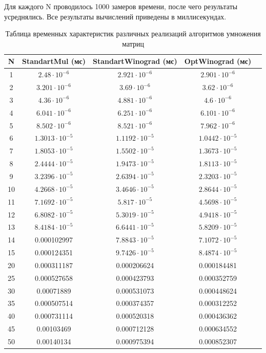 Для каждого N проводилось 1000 замеров времени, после чего результаты усреднялись. Все результаты вычислений приведены в миллисекундах.

\newpage
\begin{table}[!ht]
	\centering
	\caption{Таблица временных характеристик различных реализаций алгоритмов умножения матриц}
	\begin{tabular}{|c|c|c|c|c|}
		\hline
		N   & StandartMul (мс)  & StandartWinograd (мс) & OptWinograd (мс) \\ \hline
		1   & $2.48 \cdot 10^{-6}$   & $2.921 \cdot 10^{-6}$  & $2.901 \cdot 10^{-6}$   \\ \hline
		2   & $3.201 \cdot 10^{-6}$  & $3.69 \cdot 10^{-6}$   & $3.62 \cdot 10^{-6}$    \\ \hline
		3   & $4.36 \cdot 10^{-6}$   & $4.881 \cdot 10^{-6}$  & $4.6 \cdot 10^{-6}$     \\ \hline
		4   & $6.041 \cdot 10^{-6}$  & $6.251 \cdot 10^{-6}$  & $6.101 \cdot 10^{-6}$   \\ \hline
		5   & $8.502 \cdot 10^{-6}$  & $8.521 \cdot 10^{-6}$  & $7.962 \cdot 10^{-6}$   \\ \hline
		6   & $1.3013 \cdot 10^{-5}$ & $1.1192 \cdot 10^{-5}$ & $1.0442 \cdot 10^{-5}$  \\ \hline
		7   & $1.8053 \cdot 10^{-5}$ & $1.5502 \cdot 10^{-5}$ & $1.3673 \cdot 10^{-5}$  \\ \hline
		8   & $2.4444 \cdot 10^{-5}$ & $1.9473 \cdot 10^{-5}$ & $1.8113 \cdot 10^{-5}$  \\ \hline
		9   & $3.2396 \cdot 10^{-5}$ & $2.6394 \cdot 10^{-5}$ & $2.3203 \cdot 10^{-5}$  \\ \hline
		10  & $4.2668 \cdot 10^{-5}$ & $3.4646 \cdot 10^{-5}$ & $2.8644 \cdot 10^{-5}$  \\ \hline
		11  & $7.1692 \cdot 10^{-5}$ & $5.817 \cdot 10^{-5}$  & $4.5698 \cdot 10^{-5}$  \\ \hline
		12  & $6.8082 \cdot 10^{-5}$ & $5.3019 \cdot 10^{-5}$ & $4.9418 \cdot 10^{-5}$  \\ \hline
		13  & $8.4184 \cdot 10^{-5}$ & $6.6441 \cdot 10^{-5}$ & $5.8209 \cdot 10^{-5}$  \\ \hline
		14  & 0.000102997 & $7.8843 \cdot 10^{-5}$ & $7.1072 \cdot 10^{-5}$ \\ \hline
		15  & 0.000124351 & $9.7426 \cdot 10^{-5}$ & $8.4874 \cdot 10^{-5}$ \\ \hline
		20  & 0.000311187 & 0.000206624 & 0.000184481 \\ \hline
		25  & 0.000527658 & 0.000423793 & 0.000352759 \\ \hline
		30  & 0.00071889 & 0.000531073 & 0.000448624 \\  \hline
		35  & 0.000507514 & 0.000374357 & 0.000312252 \\ \hline
		40  & 0.000731114 & 0.000520318 & 0.000436362 \\ \hline
		45  & 0.00103469 & 0.000712128 & 0.000634552 \\ \hline
		50  & 0.00140134 & 0.000975394 & 0.000852307 \\ \hline
	\end{tabular}
	\label{table:timings}
\end{table}

